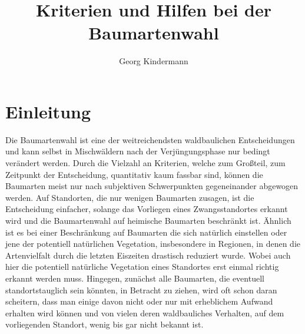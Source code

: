 \documentclass[twocolumn]{scrartcl}
\title{Kriterien und Hilfen bei der Baumartenwahl}
\author{Georg Kindermann}
\begin{document}

\tableofcontents

\section{Einleitung}

Die Baumartenwahl ist eine der weitreichendsten waldbaulichen
Entscheidungen und kann selbst in Mischwäldern nach der
Verjüngungsphase nur bedingt verändert werden. Durch die Vielzahl an
Kriterien, welche zum Großteil, zum Zeitpunkt der Entscheidung,
quantitativ kaum fassbar sind, können die Baumarten meist nur nach
subjektiven Schwerpunkten gegeneinander abgewogen werden. Auf
Standorten, die nur wenigen Baumarten zusagen, ist die Entscheidung
einfacher, solange das Vorliegen eines Zwangsstandortes erkannt wird
und die Baumartenwahl auf heimische Baumarten beschränkt ist. Ähnlich
ist es bei einer Beschränkung auf Baumarten die sich natürlich
einstellen oder jene der potentiell natürlichen Vegetation,
insbesondere in Regionen, in denen die Artenvielfalt durch die letzten
Eiszeiten drastisch reduziert wurde. Wobei auch hier die potentiell
natürliche Vegetation eines Standortes erst einmal richtig erkannt
werden muss. Hingegen, zunächst alle Baumarten, die eventuell
standortstauglich sein könnten, in Betracht zu ziehen, wird oft schon
daran scheitern, dass man einige davon nicht oder nur mit erheblichem
Aufwand erhalten wird können und von vielen deren waldbauliches
Verhalten, auf dem vorliegenden Standort, wenig bis gar nicht bekannt
ist.
\end{document}

